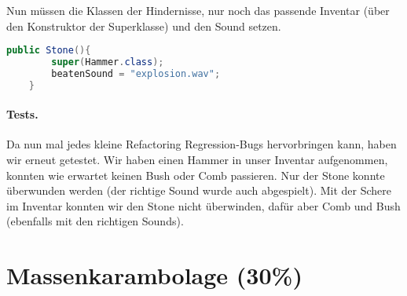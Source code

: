 \documentclass{pi1}
\begin{document}
Nun müssen die Klassen der Hindernisse, nur noch das passende Inventar (über den Konstruktor der Superklasse) und den Sound setzen.

\begin{lstlisting}[caption={Konstruktor von \emph{Stone}}, firstnumber=18, language=Java]
public Stone(){
        super(Hammer.class);
        beatenSound = "explosion.wav";
    }
\end{lstlisting}

\paragraph{Tests.}Da nun mal jedes kleine Refactoring Regression-Bugs hervorbringen kann, haben wir erneut getestet. Wir haben einen Hammer in unser Inventar aufgenommen, konnten wie erwartet keinen Bush oder Comb passieren. Nur der Stone konnte überwunden werden (der richtige Sound wurde auch abgespielt). Mit der Schere im Inventar konnten wir den Stone nicht überwinden, dafür aber Comb und Bush (ebenfalls mit den richtigen Sounds).

\section{Massenkarambolage (30\%)}
\label{s:collider}
\end{document}
